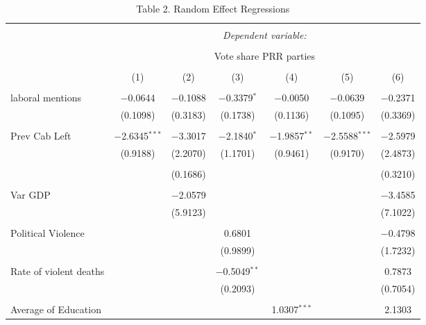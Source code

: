 
\begin{table}[!htbp] \centering 
  \caption{Table 2. Random Effect Regressions} 
  \label{} 
\begin{tabular}{@{\extracolsep{5pt}}lcccccc} 
\\[-1.8ex]\hline 
\hline \\[-1.8ex] 
 & \multicolumn{6}{c}{\textit{Dependent variable:}} \\ 
\cline{2-7} 
\\[-1.8ex] & \multicolumn{6}{c}{Vote share PRR parties} \\ 
\\[-1.8ex] & (1) & (2) & (3) & (4) & (5) & (6)\\ 
\hline \\[-1.8ex] 
 laboral mentions & $-$0.0644 & $-$0.1088 & $-$0.3379$^{*}$ & $-$0.0050 & $-$0.0639 & $-$0.2371 \\ 
  & (0.1098) & (0.3183) & (0.1738) & (0.1136) & (0.1095) & (0.3369) \\ 
  & & & & & & \\ 
 Prev Cab Left & $-$2.6345$^{***}$ & $-$3.3017 & $-$2.1840$^{*}$ & $-$1.9857$^{**}$ & $-$2.5588$^{***}$ & $-$2.5979 \\ 
  & (0.9188) & (2.2070) & (1.1701) & (0.9461) & (0.9170) & (2.4873) \\ 
  & & & & & & \\ 
  &  & (0.1686) &  &  &  & (0.3210) \\ 
  & & & & & & \\ 
 Var GDP &  & $-$2.0579 &  &  &  & $-$3.4585 \\ 
  &  & (5.9123) &  &  &  & (7.1022) \\ 
  & & & & & & \\ 
 Political Violence &  &  & 0.6801 &  &  & $-$0.4798 \\ 
  &  &  & (0.9899) &  &  & (1.7232) \\ 
  & & & & & & \\ 
 Rate of violent deaths &  &  & $-$0.5049$^{**}$ &  &  & 0.7873 \\ 
  &  &  & (0.2093) &  &  & (0.7054) \\ 
  & & & & & & \\ 
 Average of Education &  &  &  & 1.0307$^{***}$ &  & 2.1303 \\ 

\end{tabular}
\end{table}
